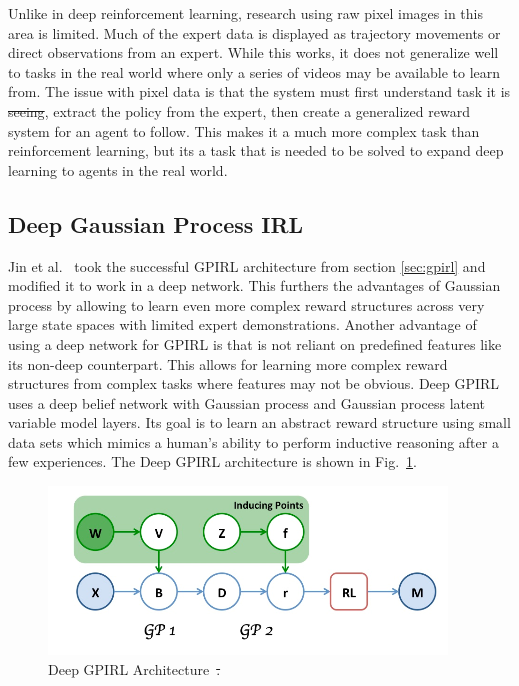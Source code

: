 \documentclass[12pt,american]{report}
\providecommand{\DIFaddtex}[1]{{\protect\color{blue}\uwave{#1}}} %
\providecommand{\DIFdeltex}[1]{{\protect\color{red}\sout{#1}}}                      %
\providecommand{\DIFaddbegin}{} %
\providecommand{\DIFaddend}{} %
\providecommand{\DIFdelbegin}{} %
\providecommand{\DIFdelend}{} %
\providecommand{\DIFaddFL}[1]{\DIFadd{#1}} %
\providecommand{\DIFdelFL}[1]{\DIFdel{#1}} %
\providecommand{\DIFaddbeginFL}{} %
\providecommand{\DIFaddendFL}{} %
\providecommand{\DIFdelbeginFL}{} %
\providecommand{\DIFdelendFL}{} %
\providecommand{\DIFadd}[1]{\texorpdfstring{\DIFaddtex{#1}}{#1}} %
\providecommand{\DIFdel}[1]{\texorpdfstring{\DIFdeltex{#1}}{}} %
\newcommand{\DIFscaledelfig}{0.5}
\newlength{\DIFdelgraphicswidth} %
\newlength{\DIFdelgraphicsheight} %
\newcommand{\DIFaddincludegraphics}[2][]{{\color{blue}\fbox{\DIFOincludegraphics[#1]{#2}}}} %
\newcommand{\DIFdelincludegraphics}[2][]{%
\sbox{\DIFdelgraphicsbox}{\DIFOincludegraphics[#1]{#2}}%
\settoboxwidth{\DIFdelgraphicswidth}{\DIFdelgraphicsbox} %
\settoboxtotalheight{\DIFdelgraphicsheight}{\DIFdelgraphicsbox} %
\scalebox{\DIFscaledelfig}{%
\parbox[b]{\DIFdelgraphicswidth}{\usebox{\DIFdelgraphicsbox}\\[-\baselineskip] \rule{\DIFdelgraphicswidth}{0em}}\llap{\resizebox{\DIFdelgraphicswidth}{\DIFdelgraphicsheight}{%
\setlength{\unitlength}{\DIFdelgraphicswidth}%
\begin{picture}(1,1)%
\thicklines\linethickness{2pt} %
{\color[rgb]{1,0,0}\put(0,0){\framebox(1,1){}}}%
{\color[rgb]{1,0,0}\put(0,0){\line( 1,1){1}}}%
{\color[rgb]{1,0,0}\put(0,1){\line(1,-1){1}}}%
\end{picture}%
}\hspace*{3pt}}} %
} %
\DeclareRobustCommand{\DIFaddbegin}{\DIFOaddbegin \let\includegraphics\DIFaddincludegraphics} %
\DeclareRobustCommand{\DIFaddend}{\DIFOaddend \let\includegraphics\DIFOincludegraphics} %
\DeclareRobustCommand{\DIFdelbegin}{\DIFOdelbegin \let\includegraphics\DIFdelincludegraphics} %
\DeclareRobustCommand{\DIFdelend}{\DIFOaddend \let\includegraphics\DIFOincludegraphics} %
\DeclareRobustCommand{\DIFaddbeginFL}{\DIFOaddbeginFL \let\includegraphics\DIFaddincludegraphics} %
\DeclareRobustCommand{\DIFaddendFL}{\DIFOaddendFL \let\includegraphics\DIFOincludegraphics} %
\DeclareRobustCommand{\DIFdelbeginFL}{\DIFOdelbeginFL \let\includegraphics\DIFdelincludegraphics} %
\DeclareRobustCommand{\DIFdelendFL}{\DIFOaddendFL \let\includegraphics\DIFOincludegraphics} %
\begin{document}
Unlike in deep reinforcement learning, research using raw pixel images in this area is limited.  Much of the expert data is displayed as trajectory movements or direct observations from an expert.  While this works, it does not generalize well to tasks in the real world where only a series of videos may be available to learn from.  The issue with pixel data is that the system must first understand \DIFaddbegin \DIFadd{the }\DIFaddend task it is \DIFdelbegin \DIFdel{seeing}\DIFdelend \DIFaddbegin \DIFadd{observing}\DIFaddend , extract the policy from the expert, then create a generalized reward system for an agent to follow.  This makes it a much more complex task than reinforcement learning, but its a task that is needed to be solved to expand deep learning to agents in the real world.

\subsection{Deep Gaussian Process IRL}
Jin et al.~\cite{jin2015inverse} took the successful GPIRL architecture from section \ref{sec:gpirl} and modified it to work in a deep network. This furthers the advantages of Gaussian process by allowing to learn even more complex reward structures across very large state spaces with limited expert demonstrations. Another advantage of using a deep network for GPIRL is that is not reliant on predefined features like its non-deep counterpart.  This allows for learning more complex reward structures from complex tasks where features may not be obvious.  Deep GPIRL uses a deep belief network with Gaussian process and Gaussian process latent variable model layers. Its goal is to learn an abstract reward structure using small data sets which mimics a human's ability to perform inductive reasoning after a few experiences. The Deep GPIRL architecture is shown in Fig.~\ref{fig:dgpirl-arch}.
\begin{figure}
\centering
\DIFdelbeginFL %
\DIFdelendFL \DIFaddbeginFL \includegraphics[scale=1.5]{images/dgpirl-arch.png}
\DIFaddendFL \caption{Deep GPIRL Architecture\DIFaddbeginFL \DIFaddFL{.}\DIFaddendFL ~\cite{jin2015inverse}\DIFdelbeginFL \DIFdelFL{.}\DIFdelendFL }
\label{fig:dgpirl-arch}
\end{figure}
\end{document}
